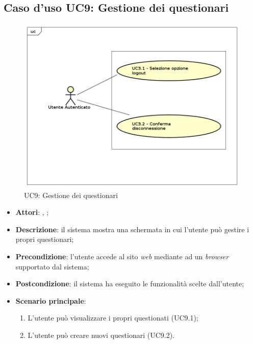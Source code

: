 \subsection{Caso d'uso UC9: Gestione dei questionari}
\label{UC9}
\begin{figure}[h]
	\centering
	\includegraphics[scale=0.7,keepaspectratio]{UML/UC9.png}
	\caption{UC9: Gestione dei questionari}
\end{figure}
\FloatBarrier
\begin{itemize}
	\item \textbf{Attori}: \uau, \uaupro;
	\item \textbf{Descrizione}: il sistema mostra una schermata in cui l'utente può gestire i propri questionari; 
	\item \textbf{Precondizione}: l'utente accede al sito \textit{web} mediante ad un \textit{browser} supportato dal sistema;
	\item \textbf{Postcondizione}: il sistema ha eseguito le funzionalità scelte dall'utente;
	\item \textbf{Scenario principale}:
		\begin{enumerate}
			\item L'utente può visualizzare i propri questionati (UC9.1);
			\item L'utente può creare nuovi questionari (UC9.2).
		\end{enumerate}
\end{itemize}

